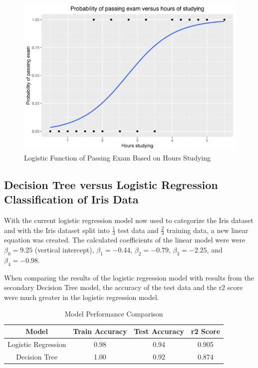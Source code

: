 \documentclass[journal]{IEEEtran}
\begin{document}
\begin{figure}[h!]
\includegraphics[scale=0.4]{wikiPassingExams.png}
\centering
\caption{Logistic Function of Passing Exam Based on Hours Studying}
\label{fig:wikilogfunction}
\end{figure}

\subsection{Decision Tree versus Logistic Regression Classification of Iris Data}

With the current logistic regression model now used to categorize the Iris dataset and with the Iris dataset split into \(\frac{1}{3}\) test data and \(\frac{2}{3}\) training data, a new linear equation was created. The calculated coefficients of the linear model were were $\beta_0 = 9.25$ (vertical intercept), $\beta_1 = -0.44$, $\beta_2 = -0.79$, $\beta_3 = -2.25$, and $\beta_4 = -0.98$.

When comparing the results of the logistic regression model with results from the secondary Decision Tree model, the accuracy of the test data and the r2 score were much greater in the logistic regression model. 

\begin{table}[h!]
\centering
\begin{tabular}{ c | c c c }
Model & Train Accuracy & Test Accuracy & r2 Score \\ 
\hline
Logistic Regression	& 0.98	& 0.94	& 0.905 \\
Decision Tree & 	1.00	& 0.92	& 0.874
\end{tabular}
\caption{Model Performance Comparison}
\label{table:model-comparison-table}
\end{table}
\end{document}
